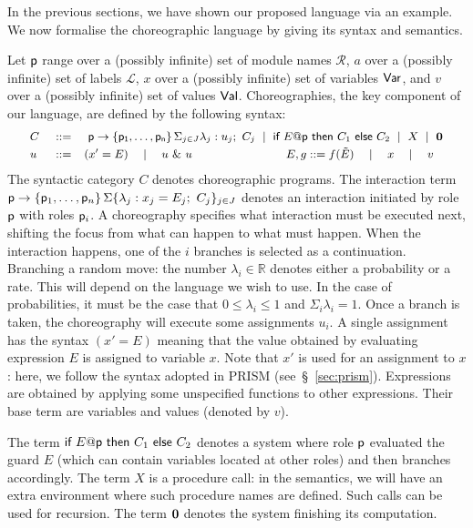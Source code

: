 In the previous sections, we have shown our proposed language via an
example. We now formalise the choreographic language by giving its
syntax and semantics.

%
Let $\mathsf{p}$ range over a (possibly infinite) set of module names
$\mathcal R$, $a$ over a (possibly infinite) set of labels
$\mathcal L$, $x$ over a (possibly infinite) set of variables
$\mathsf{Var}$, and $v$ over a (possibly infinite) set of values
$\mathsf{Val}$.
%
Choreographies, the key component of our language, are defined by the
following syntax:
%
\begin{displaymath}\small
  \begin{array}{llllllllllll}
    C \ & ::= & \
      \interact{p}{\role p_1,\ldots,\role p_n}
      \ \mid\
      \ifTE {E}{p}{C_1}{C_2}
      \ \mid\ X \ \mid\  \CEnd
    \\[1mm]
    u     & ::=  &       (x' = E) \quad\mid\quad  u\ \&\ u 
    \qquad\qquad\qquad\qquad
    E, g     ::=        f(\tilde E)\quad\mid\quad x\quad\mid\quad v

  \end{array}
\end{displaymath}
The syntactic category $C$ denotes choreographic programs. The
interaction term
$\mathsf{p}\rightarrow \{\mathsf{p}_1,\ldots,\mathsf{p}_n\}\,\Sigma\{\lambda_j:
x_j=E_j;\ C_j\}_{j\in J}$ denotes an interaction initiated by role
$\mathsf{p}$ with roles $\mathsf{p}_i$. A choreography specifies what
interaction must be executed next, shifting the focus from what can
happen to what must happen. When the interaction happens, one of the
$i$ branches is selected as a continuation. Branching a random move:
the number $\lambda_i\in\mathbb R$ denotes either a probability or a
rate. This will depend on the language we wish to use. In the case of
probabilities, it must be the case that $0\leq\lambda_i\leq 1$ and
$\Sigma_i\lambda_i=1$. Once a branch is taken, the choreography will
execute some assignments $u_i$. A single assignment has the syntax
$(x' = E)$ meaning that the value obtained by evaluating expression
$E$ is assigned to variable $x$. Note that $x'$ is used for an
assignment to $x$: here, we follow the syntax adopted in PRISM
(see~\S~\ref{sec:prism}). Expressions are obtained by applying some
unspecified functions to other expressions. Their base term are
variables and values (denoted by $v$).
%

The term
$\textsf{if } E@\mathsf{p} \textsf{ then } C_1 \textsf{ else } C_2$
denotes a system where role $\mathsf{p}$ evaluated the guard $E$ (which
can contain variables located at other roles) and then branches
accordingly.  The term $X$ is a procedure call: in the semantics, we
will have an extra environment where such procedure names are
defined. Such calls can be used for recursion. The term $\mathbf{0}$
denotes the system finishing its computation.

